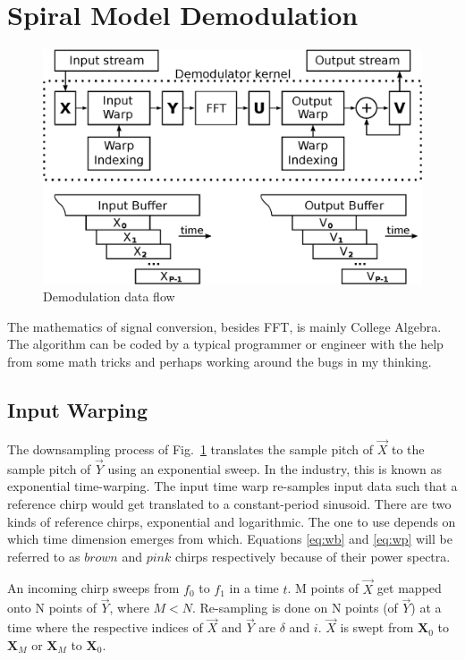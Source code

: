 \section{Spiral Model Demodulation}

\begin{figure}
    \centering
    \includegraphics[width=0.95\linewidth]{../source/demod_e}
    \caption[Quantum to Relative Time Demodulation]{Demodulation data flow}
    \label{fig:demod}
\end{figure}

The mathematics of signal conversion, besides FFT, is mainly College Algebra.
The algorithm can be coded by a typical programmer or engineer with the help
from some math tricks and perhaps working around the bugs in my thinking.

\subsection{Input Warping}

The downsampling process of Fig.~\ref{fig:demod} translates the sample pitch of
$\vec{X}$ to the sample pitch of $\vec{Y}$ using an exponential sweep.
In the industry, this is known as exponential time-warping.
The input time warp re-samples input data such that a reference chirp would get
translated to a constant-period sinusoid. 
There are two kinds of reference chirps, exponential and logarithmic.
The one to use depends on which time dimension emerges from which.
Equations \ref{eq:wb} and \ref{eq:wp} will be referred to as $brown$ and $pink$
chirps respectively because of their power spectra.

An incoming chirp sweeps from $f_0$ to $f_1$ in a time $t$.
M points of $\vec{X}$ get mapped onto N points of $\vec{Y}$, where $M < N$.
Re-sampling is done on N points (of $\vec{Y}$) at a time where the respective indices of
$\vec{X}$ and $\vec{Y}$ are $\delta$ and $i$.
$\vec{X}$ is swept from $\mathbf{X}_0$ to $\mathbf{X}_M$
or $\mathbf{X}_M$ to $\mathbf{X}_0$.

